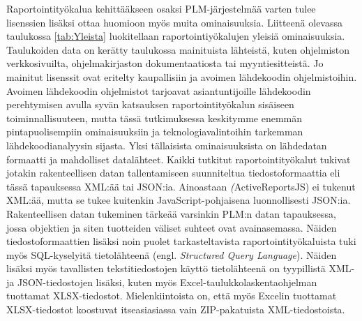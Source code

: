 Raportointityökalua kehittääkseen osaksi PLM-järjestelmää varten tulee lisenssien lisäksi ottaa huomioon myös muita ominaisuuksia. Liitteenä olevassa taulukossa \ref{tab:Yleista} luokitellaan raportointiyökalujen yleisiä ominaisuuksia. Taulukoiden data on kerätty taulukossa mainituista lähteistä, kuten ohjelmiston verkkosivuilta, ohjelmakirjaston dokumentaatiosta tai myyntiesitteistä. Jo mainitut lisenssit ovat eritelty kaupallisiin ja avoimen lähdekoodin ohjelmistoihin. Avoimen lähdekoodin ohjelmistot tarjoavat asiantuntijoille lähdekoodin perehtymisen avulla syvän katsauksen raportointityökalun sisäiseen toiminnallisuuteen, mutta tässä tutkimuksessa keskitymme enemmän pintapuolisempiin ominaisuuksiin ja teknologiavalintoihin tarkemman lähdekoodianalyysin sijasta. Yksi tällaisista ominaisuuksista on lähdedatan formaatti ja mahdolliset datalähteet. Kaikki tutkitut raportointityökalut tukivat jotakin rakenteellisen datan tallentamiseen suunniteltua tiedostoformaattia eli tässä tapauksessa XML:ää tai JSON:ia. Ainoastaan \textit(ActiveReportsJS) ei tukenut XML:ää, mutta se tukee kuitenkin JavaScript-pohjaisena luonnollisesti JSON:ia. Rakenteellisen datan tukeminen tärkeää varsinkin PLM:n datan tapauksessa, jossa objektien ja siten tuotteiden väliset suhteet ovat avainasemassa. Näiden tiedostoformaattien lisäksi noin puolet tarkasteltavista raportointityökaluista tuki myös SQL-kyselyitä tietolähteenä  (engl. \textit{Structured Query Language}). Näiden lisäksi myös tavallisten tekstitiedostojen käyttö tietolähteenä on tyypillistä XML- ja JSON-tiedostojen lisäksi, kuten myös Excel-taulukkolaskentaohjelman tuottamat XLSX-tiedostot. Mielenkiintoista on, että myös Excelin tuottamat XLSX-tiedostot koostuvat itseasiasiassa vain ZIP-pakatuista XML-tiedostoista. \cite{miner_under_2022}

